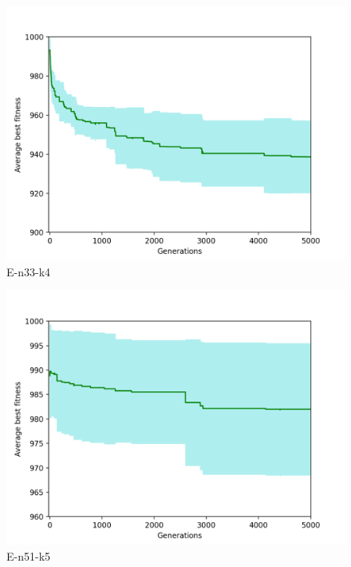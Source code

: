 \documentclass[conference,compsoc]{IEEEtran}
\begin{document}
\begin{figure}[h!]
    \centering
    \includegraphics[scale=0.35]{E-n33-k4}
    \caption{E-n33-k4}
    \label{fig:my_label}
\end{figure}
\newpage
\begin{figure}[h!]
    \centering
    \includegraphics[scale=0.35]{E-n51-k5}
    \caption{E-n51-k5}
    \label{fig:my_label}
\end{figure}
\end{document}
